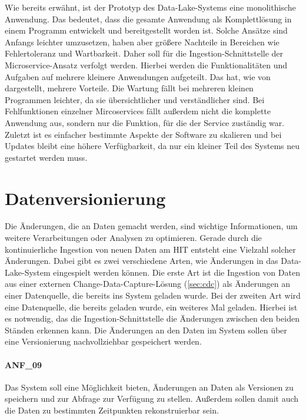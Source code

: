 Wie bereits erwähnt, ist der Prototyp des Data-Lake-Systems eine monolithische Anwendung.
Das bedeutet, dass die gesamte Anwendung als Komplettlösung in einem Programm entwickelt und bereitgestellt worden ist.
Solche Ansätze sind Anfangs leichter umzusetzen, haben aber größere Nachteile in Bereichen wie Fehlertoleranz und Wartbarkeit.
Daher soll für die Ingestion-Schnittstelle der Microservice-Ansatz verfolgt werden.
Hierbei werden die Funktionalitäten und Aufgaben auf mehrere kleinere Anwendungen aufgeteilt.
Das hat, wie von \textcite{microservices} dargestellt, mehrere Vorteile.
Die Wartung fällt bei mehreren kleinen Programmen leichter, da sie übersichtlicher und verständlicher sind.
Bei Fehlfunktionen einzelner Mircoservices fällt außerdem nicht die komplette Anwendung aus, sondern nur die Funktion, für die der Service zuständig war.
Zuletzt ist es einfacher bestimmte Aspekte der Software zu skalieren und bei Updates bleibt eine höhere Verfügbarkeit, da nur ein kleiner Teil des Systems neu gestartet werden muss.

\section{Datenversionierung}
\label{sec:anf-vers}
Die Änderungen, die an Daten gemacht werden, sind wichtige Informationen, um weitere Verarbeitungen oder Analysen zu optimieren.
Gerade durch die kontinuierliche Ingestion von neuen Daten am HIT entsteht eine Vielzahl solcher Änderungen.
Dabei gibt es zwei verschiedene Arten, wie Änderungen in das Data-Lake-System eingespielt werden können.
Die erste Art ist die Ingestion von Daten aus einer externen Change-Data-Capture-Lösung (\cref{sec:cdc}) als Änderungen an einer Datenquelle, die bereits ins System geladen wurde.
Bei der zweiten Art wird eine Datenquelle, die bereits geladen wurde, ein weiteres Mal geladen.
Hierbei ist es notwendig, das die Ingestion-Schnittstelle die Änderungen zwischen den beiden Ständen erkennen kann.
Die Änderungen an den Daten im System sollen über eine Versionierung nachvollziehbar gespeichert werden.

\paragraph{ANF\_09}
\label{ANF_09}
Das System soll eine Möglichkeit bieten, Änderungen an Daten als Versionen zu speichern und zur Abfrage zur Verfügung zu stellen.
Außerdem sollen damit auch die Daten zu bestimmten Zeitpunkten rekonstruierbar sein.

